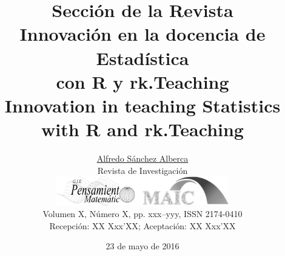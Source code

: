 \documentclass[a4paper,10pt,twoside]{article}
\begin{document}
\renewcommand{\tablename}{Tabla} 

\title{\vspace{-8mm}Sección de la Revista\\\vspace{4mm}
Innovación en la docencia de Estadística\\ con R y rk.Teaching\\\vspace{4mm}
Innovation in teaching Statistics\\ with R and rk.Teaching\vspace{-3mm}}  %
\author{\href{mailto:asalber@ceu.es}{Alfredo Sánchez Alberca}\\ \vspace{2mm} %
\scriptsize Revista de Investigación\\
\small
\href{http://www2.caminos.upm.es/Departamentos/matematicas/revistapm/}{\includegraphics[width=75.2mm]{logosrev.png}}\\
\scriptsize Volumen X, Número X, pp. xxx--yyy, ISSN 2174-0410\vspace{-2mm}\\ 
\scriptsize Recepción: XX Xxx'XX; Aceptación: XX Xxx'XX} %
\date{23 de mayo de 2016}
\maketitle
\end{document}
